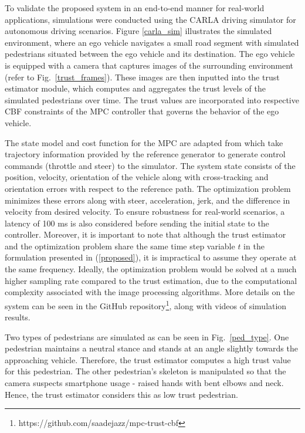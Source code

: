 \documentclass[journal]{IEEEtran}
\begin{document}
To validate the proposed system in an end-to-end manner for real-world applications, simulations were conducted using the CARLA driving simulator \cite{dosovitskiy2017carla} for autonomous driving scenarios. Figure \ref{carla_sim} illustrates the simulated environment, where an ego vehicle navigates a small road segment with simulated pedestrians situated between the ego vehicle and its destination. The ego vehicle is equipped with a camera that captures images of the surrounding environment (refer to Fig.~\ref{trust_frames}). These images are then inputted into the trust estimator module, which computes and aggregates the trust levels of the simulated pedestrians over time. The trust values are incorporated into respective CBF constraints of the MPC controller that governs the behavior of the ego vehicle.




The state model and cost function for the MPC are adapted from \cite{fu_model_predictive_control} which take trajectory information provided by the reference generator to generate control commands (throttle and steer) to the simulator. The system state consists of the position, velocity, orientation of the vehicle along with cross-tracking and orientation errors with respect to the reference path. The optimization problem minimizes these errors along with steer, acceleration, jerk, and the difference in velocity from desired velocity. To ensure robustness for real-world scenarios, a latency of 100 ms is also considered before sending the initial state to the controller. Moreover, it is important to note that although the trust estimator and the optimization problem share the same time step variable $t$ in the formulation presented in (\ref{proposed}), it is impractical to assume they operate at the same frequency. Ideally, the optimization problem would be solved at a much higher sampling rate compared to the trust estimation, due to the computational complexity associated with the image processing algorithms. More details on the system can be seen in the GitHub repository\footnote{https://github.com/saadejazz/mpc-trust-cbf}, along with videos of simulation results.

Two types of pedestrians are simulated as can be seen in Fig.~\ref{ped_type}. One pedestrian maintains a neutral stance and stands at an angle slightly towards the approaching vehicle. Therefore, the trust estimator computes a high trust value for this pedestrian. The other pedestrian's skeleton is manipulated so that the camera suspects smartphone usage - raised hands with bent elbows and neck. Hence, the trust estimator considers this as low trust pedestrian.
\end{document}
